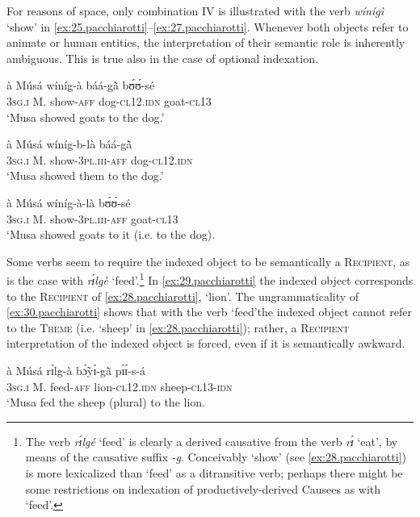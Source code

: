 \documentclass[output=paper]{langsci/langscibook}
\begin{document}
For reasons of space, only combination IV is illustrated with the verb \textit{w\'{i}n\'{i}g\`{i}} `show' in \ref{ex:25.pacchiarotti}--\ref{ex:27.pacchiarotti}. Whenever both objects refer to animate or human entities, the interpretation of their semantic role is inherently ambiguous. This is true also in the case of optional indexation.

\ea
\label{ex:25.pacchiarotti}
\gll \`{a}    M\'{u}s\'{a}  w\'{i}n\'{i}g-\`{a}  b\'{a}\'{a}-g\`{\~{a}}    bʊ́ʊ́-s\'{e} \\
\textsc{3sg.i  }  M.  show-\textsc{aff}  dog-\textsc{cl12.idn}  goat-\textsc{cl13}\\
\glt `Musa showed goats to the dog.'
\z

\ea
\label{ex:26.pacchiarotti}
\gll \`{a}    M\'{u}s\'{a}  w\'{i}n\'{i}g-b-l\`{a}    b\'{a}\'{a}-g\`{\~{a}}\\
\textsc{3sg.i} M.  show-\textsc{3pl.iii-aff}  dog-\textsc{cl12.idn}\\
\glt `Musa showed them to the dog.'  
\z

\ea
\label{ex:27.pacchiarotti}
\gll \`{a}    M\'{u}s\'{a}  w\'{i}n\'{i}g-\`{a}-l\`{a}    bʊ́ʊ́-s\'{e}\\
\textsc{3sg.i  }  M.  show-\textsc{3pl.iii-aff}  goat-\textsc{cl13}\\
\glt `Musa showed goats to it (i.e. to the dog).
\z

Some verbs seem to require the indexed object to be semantically a \textsc{Recipient}, as is the case with \textit{rɪ́lg\`{e}} `feed'.\footnote{ The verb \textit{rɪ́lg\'{e}} `feed' is clearly a derived causative from the verb \textit{rɪ́} `eat', by means of the causative suffix \textit{-g}. Conceivably `show' (see \ref{ex:28.pacchiarotti}) is more lexicalized than `feed' as a ditransitive verb; perhaps there might be some restrictions on indexation of productively-derived Causees as with `feed'.} In \ref{ex:29.pacchiarotti} the indexed object corresponds to the \textsc{Recipient} of \ref{ex:28.pacchiarotti}, `lion'. The ungrammaticality of \ref{ex:30.pacchiarotti} shows that with the verb `feed'the indexed object cannot refer to the \textsc{Theme} (i.e. `sheep' in \ref{ex:28.pacchiarotti}); rather, a \textsc{Recipient} interpretation of the indexed object is forced, even if it is semantically awkward.

\ea
\label{ex:28.pacchiarotti}
\gll \`{a}    M\'{u}s\'{a}  rɪ́lg-\`{a}    bɔ̃̀yɪ́-g\`{\~{a}}    pɪ́ɪ́-s-\'{a}\\
\textsc{3sg.i  }  M.  feed-\textsc{aff}  lion-\textsc{cl12.idn}  sheep-\textsc{cl13-idn}\\
\glt `Musa fed the sheep (plural) to the lion.
\z
\end{document}
